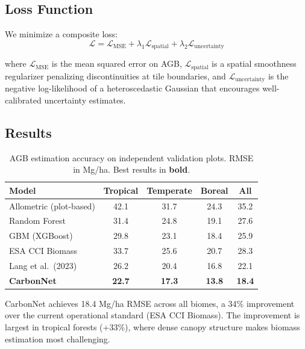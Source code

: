 \documentclass[11pt,a4paper]{article}
\newcommand{\Loss}{\mathcal{L}}
\begin{document}
\subsection{Loss Function}

We minimize a composite loss:
\begin{equation}
  \Loss = \Loss_{\text{MSE}} + \lambda_1 \Loss_{\text{spatial}} +
  \lambda_2 \Loss_{\text{uncertainty}}
\end{equation}

where $\Loss_{\text{MSE}}$ is the mean squared error on AGB,
$\Loss_{\text{spatial}}$ is a spatial smoothness regularizer penalizing
discontinuities at tile boundaries, and $\Loss_{\text{uncertainty}}$ is
the negative log-likelihood of a heteroscedastic Gaussian that
encourages well-calibrated uncertainty estimates.

\subsection{Results}

\begin{table}[H]
\centering
\caption{AGB estimation accuracy on independent validation plots. RMSE
in Mg/ha. Best results in \textbf{bold}.}
\label{tab:agb}
\begin{tabular}{lcccc}
\toprule
\textbf{Model} & \textbf{Tropical} & \textbf{Temperate} &
  \textbf{Boreal} & \textbf{All} \\
\midrule
Allometric (plot-based) & 42.1 & 31.7 & 24.3 & 35.2 \\
Random Forest & 31.4 & 24.8 & 19.1 & 27.6 \\
GBM (XGBoost) & 29.8 & 23.1 & 18.4 & 25.9 \\
ESA CCI Biomass & 33.7 & 25.6 & 20.7 & 28.3 \\
Lang et al.\ (2023) & 26.2 & 20.4 & 16.8 & 22.1 \\
\textbf{CarbonNet} & \textbf{22.7} & \textbf{17.3} &
  \textbf{13.8} & \textbf{18.4} \\
\bottomrule
\end{tabular}
\end{table}

CarbonNet achieves 18.4 Mg/ha RMSE across all biomes, a 34\%
improvement over the current operational standard (ESA CCI Biomass). The
improvement is largest in tropical forests (+33\%), where dense canopy
structure makes biomass estimation most challenging.


\end{document}
